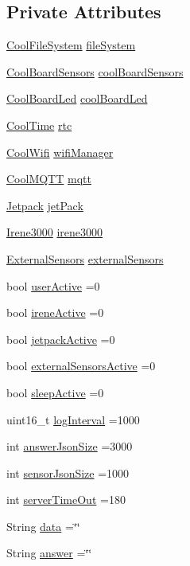 \subsection*{Private Attributes}
\begin{DoxyCompactItemize}
\item 
\hyperlink{classCoolFileSystem}{Cool\+File\+System} \hyperlink{classCoolBoard_a42c2586fbb13ff7f06538e9284e8538d}{file\+System}
\item 
\hyperlink{classCoolBoardSensors}{Cool\+Board\+Sensors} \hyperlink{classCoolBoard_af102be5288bd7f7a8e59b13f86e26a00}{cool\+Board\+Sensors}
\item 
\hyperlink{classCoolBoardLed}{Cool\+Board\+Led} \hyperlink{classCoolBoard_a1b1d3c684a5baa56b08486e192fd8e97}{cool\+Board\+Led}
\item 
\hyperlink{classCoolTime}{Cool\+Time} \hyperlink{classCoolBoard_a50d2a6716879d64a85f3c6b44ad63275}{rtc}
\item 
\hyperlink{classCoolWifi}{Cool\+Wifi} \hyperlink{classCoolBoard_acd88e6003606b47479ebba81e4aceeca}{wifi\+Manager}
\item 
\hyperlink{classCoolMQTT}{Cool\+M\+Q\+TT} \hyperlink{classCoolBoard_a2399f44d7c23c1149a335cb3b46d90f1}{mqtt}
\item 
\hyperlink{classJetpack}{Jetpack} \hyperlink{classCoolBoard_a30b1357881b01ccbec676856a91e48e9}{jet\+Pack}
\item 
\hyperlink{classIrene3000}{Irene3000} \hyperlink{classCoolBoard_ad103718ce316006c4695b8eb312eaf11}{irene3000}
\item 
\hyperlink{classExternalSensors}{External\+Sensors} \hyperlink{classCoolBoard_a09e26264839c65873eb56af476eff6b2}{external\+Sensors}
\item 
bool \hyperlink{classCoolBoard_a6395459131d6889a3005f79c7a35e964}{user\+Active} =0
\item 
bool \hyperlink{classCoolBoard_a9c3f7ac625481ee2ae802a25d97a4ae0}{irene\+Active} =0
\item 
bool \hyperlink{classCoolBoard_a9be03a913d26e558328935ca3b59a75e}{jetpack\+Active} =0
\item 
bool \hyperlink{classCoolBoard_a638b00b76aeb819ecfd4c10b8cdd7bb7}{external\+Sensors\+Active} =0
\item 
bool \hyperlink{classCoolBoard_a0a51b2287139f66c738101fb53139230}{sleep\+Active} =0
\item 
uint16\+\_\+t \hyperlink{classCoolBoard_a4de0096d575d66b472c4c1f0111fd452}{log\+Interval} =1000
\item 
int \hyperlink{classCoolBoard_af2da1f85315b3d074a8b87d158094fb7}{answer\+Json\+Size} =3000
\item 
int \hyperlink{classCoolBoard_a58e4b6072e3ac8b141ec0befb479208e}{sensor\+Json\+Size} =1000
\item 
int \hyperlink{classCoolBoard_a7a8d8d3d316220cdd049cd63c1aa8fe6}{server\+Time\+Out} =180
\item 
String \hyperlink{classCoolBoard_a427fb753dd8575bdf821c70a5c63d695}{data} =\char`\"{}\char`\"{}
\item 
String \hyperlink{classCoolBoard_a7b835fafd449e5282f7f91d787a2dc15}{answer} =\char`\"{}\char`\"{}
\end{DoxyCompactItemize}


